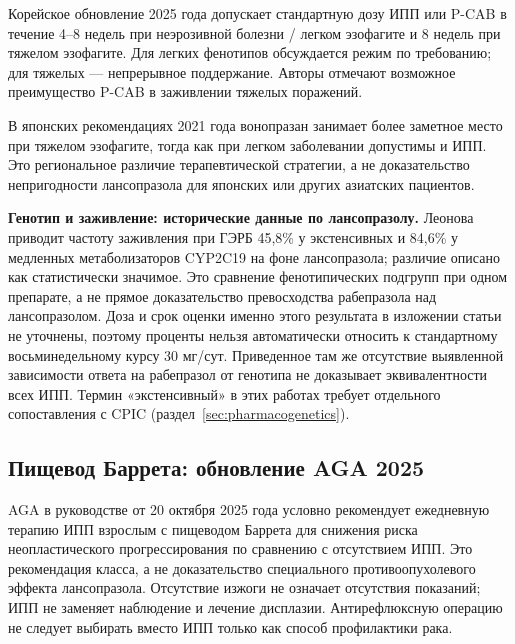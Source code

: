 \documentclass[11pt,a4paper,notitlepage]{report}
\newcommand{\src}[1]{\unskip\space\cite{#1}}
\begin{document}
Корейское обновление 2025 года допускает стандартную дозу ИПП или P-CAB в течение 4--8 недель при неэрозивной болезни / легком эзофагите и 8 недель при тяжелом эзофагите. Для легких фенотипов обсуждается режим по требованию; для тяжелых --- непрерывное поддержание. Авторы отмечают возможное преимущество P-CAB в заживлении тяжелых поражений.\src{seoul}

В японских рекомендациях 2021 года вонопразан занимает более заметное место при тяжелом эзофагите, тогда как при легком заболевании допустимы и ИПП. Это региональное различие терапевтической стратегии, а не доказательство непригодности лансопразола для японских или других азиатских пациентов.\src{jgerd}

\textbf{Генотип и заживление: исторические данные по лансопразолу.} Леонова приводит частоту заживления при ГЭРБ 45,8\% у экстенсивных и 84,6\% у медленных метаболизаторов CYP2C19 на фоне лансопразола; различие описано как статистически значимое. Это сравнение фенотипических подгрупп при одном препарате, а не прямое доказательство превосходства рабепразола над лансопразолом. Доза и срок оценки именно этого результата в изложении статьи не уточнены, поэтому проценты нельзя автоматически относить к стандартному восьминедельному курсу 30 мг/сут. Приведенное там же отсутствие выявленной зависимости ответа на рабепразол от генотипа не доказывает эквивалентности всех ИПП. Термин «экстенсивный» в этих работах требует отдельного сопоставления с CPIC (раздел~\ref{sec:pharmacogenetics}).\src{leonova2015}

\subsection{Пищевод Баррета: обновление AGA 2025}
AGA в руководстве от 20 октября 2025 года условно рекомендует ежедневную терапию ИПП взрослым с пищеводом Баррета для снижения риска неопластического прогрессирования по сравнению с отсутствием ИПП. Это рекомендация класса, а не доказательство специального противоопухолевого эффекта лансопразола. Отсутствие изжоги не означает отсутствия показаний; ИПП не заменяет наблюдение и лечение дисплазии. Антирефлюксную операцию не следует выбирать вместо ИПП только как способ профилактики рака.\src{barrett2025}
\end{document}
